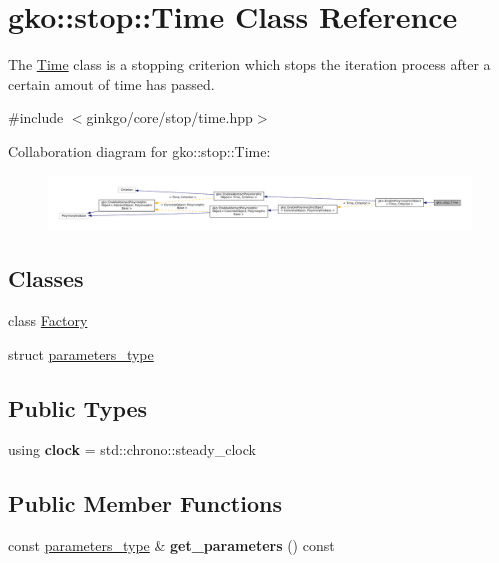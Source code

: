 \hypertarget{classgko_1_1stop_1_1Time}{}\section{gko\+:\+:stop\+:\+:Time Class Reference}
\label{classgko_1_1stop_1_1Time}


The \hyperlink{classgko_1_1stop_1_1Time}{Time} class is a stopping criterion which stops the iteration process after a certain amout of time has passed.  




{\ttfamily \#include $<$ginkgo/core/stop/time.\+hpp$>$}



Collaboration diagram for gko\+:\+:stop\+:\+:Time\+:
\nopagebreak
\begin{figure}[H]
\begin{center}
\leavevmode
\includegraphics[width=350pt]{classgko_1_1stop_1_1Time__coll__graph}
\end{center}
\end{figure}
\subsection*{Classes}
\begin{DoxyCompactItemize}
\item 
class \hyperlink{classgko_1_1stop_1_1Time_1_1Factory}{Factory}
\item 
struct \hyperlink{structgko_1_1stop_1_1Time_1_1parameters__type}{parameters\+\_\+type}
\end{DoxyCompactItemize}
\subsection*{Public Types}
\begin{DoxyCompactItemize}
\item 
\mbox{\label{classgko_1_1stop_1_1Time_aa6fa3c51e6f344c6e9a99d0819d85b2f}} 
using {\bfseries clock} = std\+::chrono\+::steady\+\_\+clock
\end{DoxyCompactItemize}
\subsection*{Public Member Functions}
\begin{DoxyCompactItemize}
\item 
\mbox{\label{classgko_1_1stop_1_1Time_a9de28a990182ba108e2f6e1e1dfdbd59}} 
const \hyperlink{structgko_1_1stop_1_1Time_1_1parameters__type}{parameters\+\_\+type} \& {\bfseries get\+\_\+parameters} () const
\end{DoxyCompactItemize}
